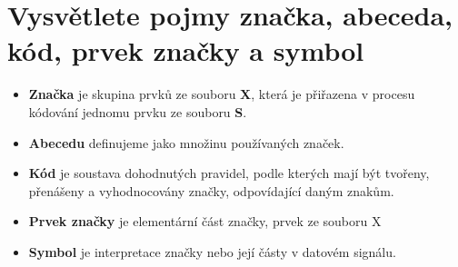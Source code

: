 \section{Vysvětlete pojmy značka, abeceda, kód, prvek značky a symbol}
\begin{itemize}
    \item \textbf{Značka} je skupina prvků ze souboru \textbf{X}, která je přiřazena v procesu kódování jednomu prvku ze souboru \textbf{S}.
    \item \textbf{Abecedu} definujeme jako množinu používaných značek.
    \item \textbf{Kód} je soustava dohodnutých pravidel, podle kterých mají být tvořeny, přenášeny a vyhodnocovány značky, odpovídající daným znakům.
    \item \textbf{Prvek značky} je elementární část značky, prvek ze souboru X
    \item \textbf{Symbol} je interpretace značky nebo její částy v datovém signálu.
\end{itemize}

